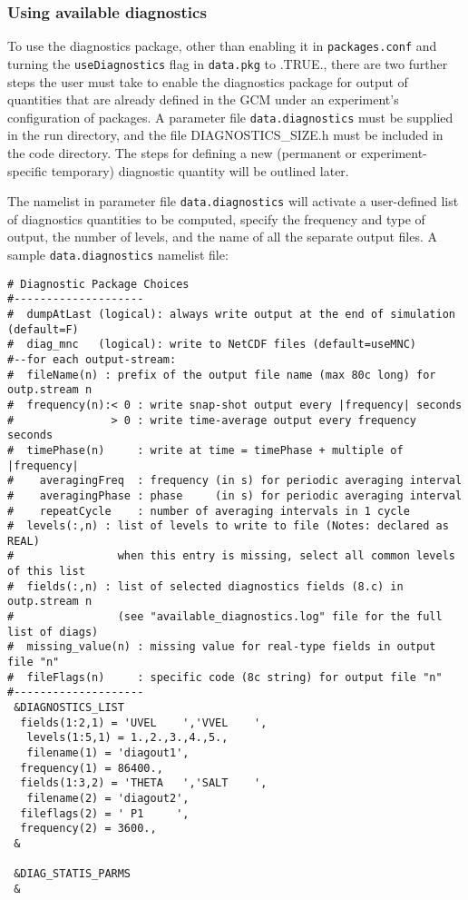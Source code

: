 \subsubsection{Using available diagnostics}
\noindent
To use the diagnostics package, other than enabling it in {\tt packages.conf}
and turning the {\tt useDiagnostics} flag in {\tt data.pkg} to .TRUE., there are two
further steps the user must take to enable the diagnostics package for
output of quantities that are already defined in the GCM under an experiment's
configuration of packages.
A parameter file {\tt data.diagnostics} must be supplied in the run directory,
and the file DIAGNOSTICS\_SIZE.h must be included in the
code directory.  The steps for defining a new (permanent or experiment-specific
temporary) diagnostic quantity will be outlined later.

\noindent The namelist in parameter file {\tt data.diagnostics} will activate
a user-defined list of diagnostics quantities to be computed,
specify the frequency and type of output, the number of levels, and
the name of all the separate output files.
A sample {\tt data.diagnostics} namelist file:

\begin{verbatim}
# Diagnostic Package Choices
#--------------------
#  dumpAtLast (logical): always write output at the end of simulation (default=F)
#  diag_mnc   (logical): write to NetCDF files (default=useMNC)
#--for each output-stream:
#  fileName(n) : prefix of the output file name (max 80c long) for outp.stream n
#  frequency(n):< 0 : write snap-shot output every |frequency| seconds
#               > 0 : write time-average output every frequency seconds
#  timePhase(n)     : write at time = timePhase + multiple of |frequency|
#    averagingFreq  : frequency (in s) for periodic averaging interval
#    averagingPhase : phase     (in s) for periodic averaging interval
#    repeatCycle    : number of averaging intervals in 1 cycle
#  levels(:,n) : list of levels to write to file (Notes: declared as REAL)
#                when this entry is missing, select all common levels of this list
#  fields(:,n) : list of selected diagnostics fields (8.c) in outp.stream n
#                (see "available_diagnostics.log" file for the full list of diags)
#  missing_value(n) : missing value for real-type fields in output file "n"
#  fileFlags(n)     : specific code (8c string) for output file "n"
#--------------------
 &DIAGNOSTICS_LIST
  fields(1:2,1) = 'UVEL    ','VVEL    ',
   levels(1:5,1) = 1.,2.,3.,4.,5.,
   filename(1) = 'diagout1',
  frequency(1) = 86400.,
  fields(1:3,2) = 'THETA   ','SALT    ',
   filename(2) = 'diagout2',
  fileflags(2) = ' P1     ',
  frequency(2) = 3600.,
 &

 &DIAG_STATIS_PARMS
 &
\end{verbatim}

